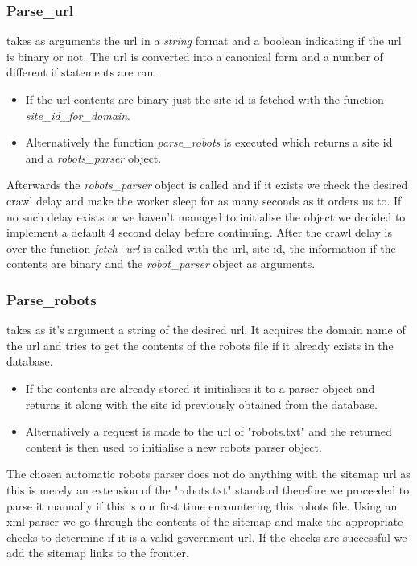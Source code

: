 \documentclass[runningheads]{llncs}
\begin{document}
\subsubsection{Parse\_url}
takes as arguments the url in a \textit{string} format and a boolean indicating if the url is binary or not. The url is converted into a canonical form and a number of different if statements are ran.
\begin{itemize}
\item If the url contents are binary just the site id is fetched with the function \textit{site\_id\_for\_domain}.
\item Alternatively the function \textit{parse\_robots} is executed which returns a site id and a \textit{robots\_parser} object.
\end{itemize}
Afterwards the \textit{robots\_parser} object is called and if it exists we check the desired crawl delay and make the worker sleep for as many seconds as it orders us to. If no such delay exists or we haven't managed to initialise the object we decided to implement a default 4 second delay before continuing. After the crawl delay is over the function \textit{fetch\_url} is called with the url, site id, the information if the contents are binary and the \textit{robot\_parser} object as arguments.

\subsubsection{Parse\_robots}
takes as it's argument a string of the desired url. It acquires the domain name of the url and tries to get the contents of the robots file if it already exists in the database. 
\begin{itemize}
\item If the contents are already stored it initialises it to a parser object and returns it along with the site id previously obtained from the database. 
\item Alternatively a request is made to the url of "robots.txt" and the returned content is then used to initialise a new robots parser object.
\end{itemize}
The chosen automatic robots parser does not do anything with the sitemap url as this is merely an extension of the "robots.txt" standard therefore we proceeded to parse it manually if this is our first time encountering this robots file. Using an xml parser we go through the contents of the sitemap and make the appropriate checks to determine if it is a valid government url. If the checks are successful we add the sitemap links to the frontier.
\end{document}
